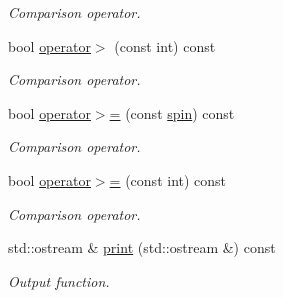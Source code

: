 \begin{DoxyCompactItemize}
\begin{DoxyCompactList}\small\item\em Comparison operator. \end{DoxyCompactList}\item 
\hypertarget{a00514_a3e08b91fc15d7275d8db060402d34e8e}{}bool \hyperlink{a00514_a3e08b91fc15d7275d8db060402d34e8e}{operator$>$} (const int) const \label{a00514_a3e08b91fc15d7275d8db060402d34e8e}

\begin{DoxyCompactList}\small\item\em Comparison operator. \end{DoxyCompactList}\item 
\hypertarget{a00514_afce1cce25214f867a2fe4fcf6d14ce87}{}bool \hyperlink{a00514_afce1cce25214f867a2fe4fcf6d14ce87}{operator$>$=} (const \hyperlink{a00514}{spin}) const \label{a00514_afce1cce25214f867a2fe4fcf6d14ce87}

\begin{DoxyCompactList}\small\item\em Comparison operator. \end{DoxyCompactList}\item 
\hypertarget{a00514_a8d9d2f96c3942ecee9d55e2a83a2250d}{}bool \hyperlink{a00514_a8d9d2f96c3942ecee9d55e2a83a2250d}{operator$>$=} (const int) const \label{a00514_a8d9d2f96c3942ecee9d55e2a83a2250d}

\begin{DoxyCompactList}\small\item\em Comparison operator. \end{DoxyCompactList}\item 
\hypertarget{a00514_a8b391d0065528c5748f11d31643b3c57}{}std\+::ostream \& \hyperlink{a00514_a8b391d0065528c5748f11d31643b3c57}{print} (std\+::ostream \&) const \label{a00514_a8b391d0065528c5748f11d31643b3c57}

\begin{DoxyCompactList}\small\item\em Output function. \end{DoxyCompactList}\end{DoxyCompactItemize}
